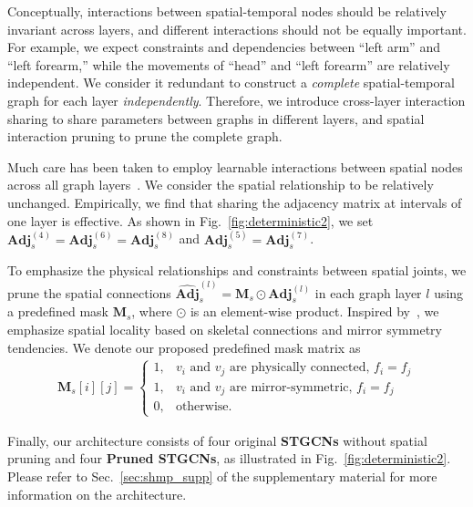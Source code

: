 Conceptually, interactions between spatial-temporal nodes should be relatively invariant across layers, and different interactions should not be equally important. For example, we expect constraints and dependencies between ``left arm'' and ``left forearm,'' while the movements of ``head'' and ``left forearm'' are relatively independent.
We consider it redundant to construct a {\em complete} spatial-temporal graph for each layer {\em independently}. Therefore, we introduce cross-layer interaction sharing to share parameters between graphs in different layers, and spatial interaction pruning to prune the complete graph.

Much care has been taken to employ learnable interactions between spatial nodes across all graph layers~\cite{Sofianos_2021_ICCV,wei2019motion,yan2021dmsgcn}.
We consider the spatial relationship to be relatively unchanged. Empirically, we find that sharing the adjacency matrix at intervals of one layer is effective. As shown in Fig.~\ref{fig:deterministic2}, we set $\mathbf {Adj}_s^{(4)} = \mathbf {Adj}_s^{(6)} = \mathbf {Adj}_s^{(8)}$ and $\mathbf {Adj}_s^{(5)} = \mathbf {Adj}_s^{(7)}$.

To emphasize the physical relationships and constraints between spatial joints, we prune the spatial connections $\mathbf {\widehat{Adj}}_s^{(l)} = \mathbf M_s \odot \mathbf {Adj}_s^{(l)}$ in each graph layer $l$ using a predefined mask $\mathbf M_s$, where $\odot$ is an element-wise product.
Inspired by~\cite{Liu_2021_ICCV}, we emphasize spatial locality based on skeletal connections and mirror symmetry tendencies. We denote our proposed predefined mask matrix as
\begin{align}
    \mathbf M_s[i][j] = \begin{cases} 1, & v_i \mbox{ and } v_j \mbox{ are physically connected, }f_i=f_j \\
    1, & v_i \mbox{ and } v_j \mbox{ are mirror-symmetric, }f_i=f_j  \\ 0, & \mbox{otherwise}. \end{cases}
\end{align}

Finally, our architecture consists of four original \textbf{STGCNs} without spatial pruning and four \textbf{Pruned STGCNs}, as illustrated in Fig.~\ref{fig:deterministic2}. Please refer to Sec.~\ref{sec:shmp_supp} of the supplementary material for more information on the architecture.

